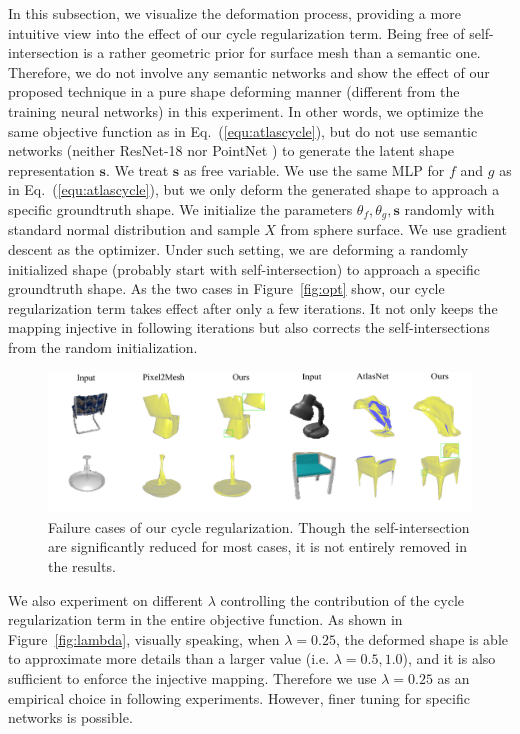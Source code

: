 In this subsection, we visualize the deformation process, providing a more intuitive view into the effect of our cycle regularization term. Being free of self-intersection is a rather geometric prior for surface mesh than a semantic one. Therefore, we do not involve any semantic networks and show the effect of our proposed technique in a pure shape deforming manner (different from the training neural networks) in this experiment. In other words, we optimize the same objective function as in Eq.~(\ref{equ:atlascycle}), but do not use semantic networks (neither ResNet-18 \cite{resnet} nor PointNet \cite{pointnet}) to generate the latent shape representation $\mathbf{s}$. We treat $\mathbf{s}$ as free variable.  We use the same MLP for $f$ and $g$ as in Eq.~(\ref{equ:atlascycle}), but we only deform the generated shape to approach a specific groundtruth shape. We initialize the parameters $\theta_f,\theta_g,\mathbf{s}$ randomly with standard normal distribution and sample $X$ from sphere surface. We use gradient descent as the optimizer. Under such setting, we are deforming a randomly initialized shape (probably start with self-intersection) to approach a specific groundtruth shape. As the two cases in Figure~\ref{fig:opt} show, our cycle regularization term takes effect after only a few iterations. It not only keeps the mapping injective in following iterations but also corrects the self-intersections from the random initialization.

\begin{figure}
	\centering
	\includegraphics[width=\textwidth]{img/limit/limit}
	\caption{Failure cases of our cycle regularization. Though the self-intersection are significantly reduced for most cases, it is not entirely removed in the results.}
	\label{fig:limit}
\end{figure}

We also experiment on different $\lambda$ controlling the contribution of the cycle regularization term in the entire objective function. As shown in Figure~\ref{fig:lambda}, visually speaking, when $\lambda=0.25$, the deformed shape is able to approximate more details than a larger value (i.e. $\lambda=0.5,1.0$), and it is also sufficient to enforce the injective mapping.  Therefore we use $\lambda=0.25$ as an empirical choice in following experiments. However, finer tuning for specific networks is possible.

